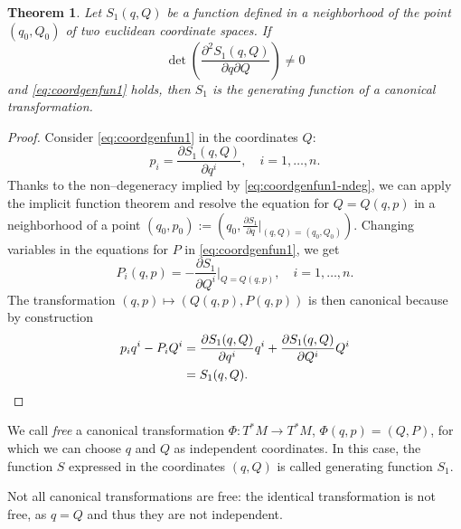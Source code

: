 \documentclass[english,fontsize=11pt,paper=a5,oneside]{scrbook}
\let\d\relax
\newcommand{\d}{\mathrm{d}}
\newtheorem{theorem}{Theorem}[chapter]
\theoremstyle{definition}
\newenvironment{remark}
  {\pushQED{\qed}\renewcommand{\qedsymbol}{$\lozenge$}\remarkx}
  {\popQED\endremarkx}
\begin{document}
\begin{theorem}\label{thm:S1}
  Let $S_1(q,Q)$ be a function defined in a neighborhood of the point $(q_0, Q_0)$ of two euclidean coordinate spaces. If
  \begin{equation}\label{eq:coordgenfun1-ndeg}
    \det\left( \frac{\partial^2 S_1(q,Q)}{\partial q \partial Q} \right)\neq 0
  \end{equation}
  and \eqref{eq:coordgenfun1} holds, then $S_1$ is the generating function of a canonical transformation.
\end{theorem}
\begin{proof}
  Consider \eqref{eq:coordgenfun1} in the coordinates $Q$:
  \begin{equation}
    p_i = \frac{\partial S_1(q,Q)}{\partial q^i}, \quad i = 1,\ldots, n.
  \end{equation}
  Thanks to the non--degeneracy implied by \eqref{eq:coordgenfun1-ndeg}, we can apply the implicit function theorem and resolve the equation for $Q = Q(q,p)$ in a neighborhood of a point $(q_0, p_0) := \left(q_0, \frac{\partial S_1}{\partial q}\Big|_{(q,Q) =(q_0, Q_0)}\right)$.
  Changing variables in the equations for $P$ in \eqref{eq:coordgenfun1}, we get
  \begin{equation}
    P_i(q,p) = -\frac{\partial S_1}{\partial Q^i}\Big|_{Q=Q(q,p)},\quad i=1,\ldots,n.
  \end{equation}
  The transformation $(q,p) \mapsto (Q(q,p), P(q,p))$ is then canonical because by construction
  \begin{align}
    p_i \d q^i - P_i \d Q^i & = \frac{\partial S_1(q,Q)}{\partial q^i}\d q^i + \frac{\partial S_1(q,Q)}{\partial Q^i}\d Q^i \\
                            & = \d S_1(q,Q).
  \end{align}
\end{proof}

\begin{tcolorbox}
  We call \emph{free} a canonical transformation $\Phi:T^*M\to T^* M$, $\Phi(q,p) = (Q,P)$, for which we can choose $q$ and $Q$ as independent coordinates.
  In this case, the function $S$ expressed in the coordinates $(q,Q)$ is called generating function $S_1$.
\end{tcolorbox}

\begin{remark}
  Not all canonical transformations are free: the identical transformation is not free, as $q=Q$ and thus they are not independent.
\end{remark}
\end{document}
